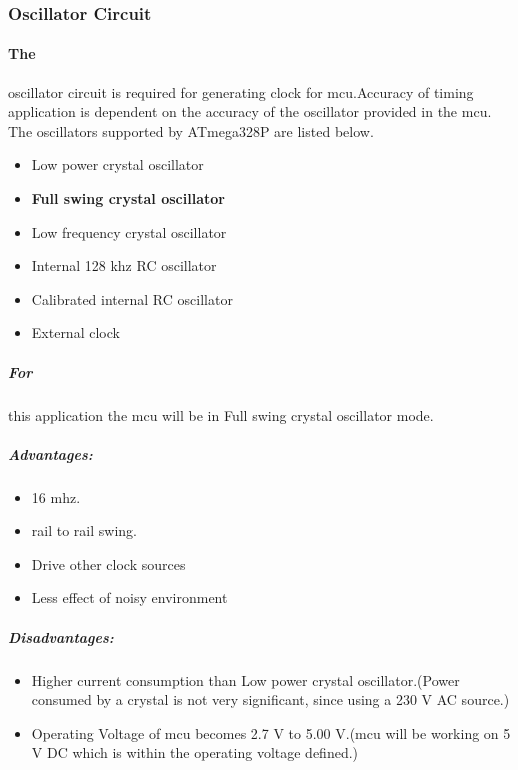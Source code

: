 

\subsubsection{Oscillator Circuit}

	\paragraph{The} oscillator circuit is required for generating clock for \gls{mcu}.Accuracy of timing application is dependent on the accuracy of the oscillator provided in the \gls{mcu}. The oscillators supported by ATmega328P are listed below.
		\begin{itemize}
			\item Low power crystal oscillator
			\item \textbf{Full swing crystal oscillator}
			\item Low frequency crystal oscillator
			\item Internal 128 \gls{khz} RC oscillator
			\item Calibrated internal RC oscillator
			\item External clock
		\end{itemize}		
		
	\subparagraph{For }
	this application the \gls{mcu} will be in Full swing crystal oscillator mode.
	
	\subparagraph{\textbf{Advantages:}}
		
		\begin{itemize}
			\item 16 \gls{mhz}.
			\item rail to rail swing.
			\item Drive other clock sources
			\item Less effect of noisy environment 
		\end{itemize}		
	 
	 \subparagraph{Disadvantages:}
	 
	 	\begin{itemize}
	 		\item Higher current consumption than Low power crystal oscillator.(Power consumed by a crystal is not very significant, since using a 230 V AC source.)
	 		\item Operating Voltage of \gls{mcu} becomes 2.7 V to 5.00 V.(\gls{mcu} will be working on 5 V DC which is within the operating voltage defined.) 
		\end{itemize}	  	  
		
